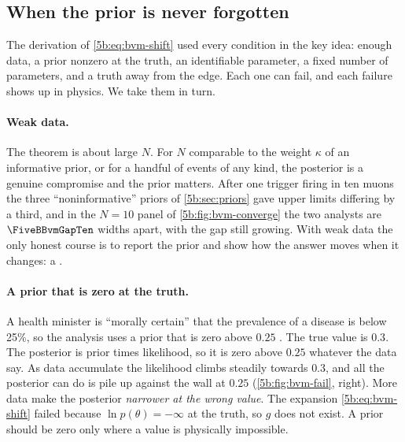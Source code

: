 \subsection{When the prior is never forgotten}

The derivation of \eqref{5b:eq:bvm-shift} used every condition in the key idea: enough
data, a prior nonzero at the truth, an identifiable parameter, a fixed number of
parameters, and a truth away from the edge. Each one can fail, and each failure shows up
in physics. We take them in turn.

\paragraph{Weak data.} The theorem is about large $N$. For $N$ comparable to the weight
$\kappa$ of an informative prior, or for a handful of events of any kind, the posterior
is a genuine compromise and the prior matters. After one trigger firing in ten muons the
three ``noninformative'' priors of \cref{5b:sec:priors} gave upper limits differing by a
third, and in the $N=10$ panel of \cref{5b:fig:bvm-converge} the two analysts are
$\FiveBBvmGapTen$ widths apart, with the gap still growing. With weak data the only
honest course is to report the prior and show how the answer moves when it changes: a
 .

\paragraph{A prior that is zero at the truth.} A health minister is ``morally certain''
that the prevalence of a disease is below 25\%, so the analysis uses a prior that is zero
above $0.25$ . The true value is $0.3$. The posterior is prior
times likelihood, so it is zero above $0.25$ whatever the data say. As data accumulate
the likelihood climbs steadily towards $0.3$, and all the posterior can do is pile up
against the wall at $0.25$ (\cref{5b:fig:bvm-fail}, right). More data make the posterior
\emph{narrower at the wrong value}. The expansion \eqref{5b:eq:bvm-shift} failed because
$\ln p(\theta)=-\infty$ at the truth, so $g$ does not exist. A prior should be zero only
where a value is physically impossible.

